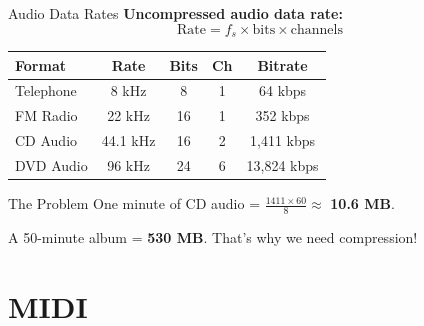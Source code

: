 \documentclass[aspectratio=169,12pt]{beamer}
\begin{document}
\begin{frame}{Audio Data Rates}
    \textbf{Uncompressed audio data rate:}
    \[
        \text{Rate} = f_s \times \text{bits} \times \text{channels}
    \]
    
    \vspace{0.2cm}
    \begin{center}
        \begin{tabular}{l|c|c|c|c}
            \toprule
            \textbf{Format} & \textbf{Rate} & \textbf{Bits} & \textbf{Ch} & \textbf{Bitrate} \\
            \midrule
            Telephone & 8 kHz & 8 & 1 & 64 kbps \\
            FM Radio & 22 kHz & 16 & 1 & 352 kbps \\
            CD Audio & 44.1 kHz & 16 & 2 & 1,411 kbps \\
            DVD Audio & 96 kHz & 24 & 6 & 13,824 kbps \\
            \bottomrule
        \end{tabular}
    \end{center}
    
    \vspace{0.3cm}
    \begin{alertblock}{The Problem}
        One minute of CD audio = $\frac{1411 \times 60}{8} \approx$ \textbf{10.6 MB}.
        
        A 50-minute album = \textbf{530 MB}. That's why we need compression!
    \end{alertblock}
\end{frame}

\section{MIDI}
\end{document}
